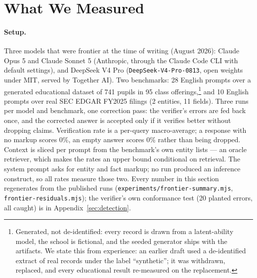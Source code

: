 \documentclass[11pt,a4paper]{article}
\begin{document}
\section{What We Measured}
\label{sec:evaluation}

\paragraph{Setup.} Three models that were frontier at the time of writing (August 2026): Claude Opus 5 and Claude Sonnet 5 (Anthropic, through the Claude Code CLI with default settings), and DeepSeek V4 Pro (\texttt{DeepSeek-V4-Pro-0813}, open weights under MIT, served by Together AI). Two benchmarks: 28 English prompts over a generated educational dataset of 741 pupils in 95 class offerings,\footnote{Generated, not de-identified: every record is drawn from a latent-ability model, the school is fictional, and the seeded generator ships with the artifacts. We state this from experience: an earlier draft used a de-identified extract of real records under the label ``synthetic''; it was withdrawn, replaced, and every educational result re-measured on the replacement.} and 10 English prompts over real SEC EDGAR FY2025 filings (2 entities, 11 fields). Three runs per model and benchmark, one correction pass: the verifier's errors are fed back once, and the corrected answer is accepted only if it verifies better without dropping claims. Verification rate is a per-query macro-average; a response with no markup scores 0\%, an empty answer scores 0\% rather than being dropped. Context is sliced per prompt from the benchmark's own entity lists --- an oracle retriever, which makes the rates an upper bound conditional on retrieval. The system prompt asks for entity and fact markup; no run produced an inference construct, so all rates measure those two. Every number in this section regenerates from the published runs (\texttt{experiments/frontier-summary.mjs}, \texttt{frontier-residuals.mjs}); the verifier's own conformance test (20 planted errors, all caught) is in Appendix~\ref{sec:detection}.
\end{document}
